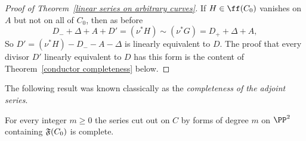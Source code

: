 \begin{proof}[Proof of Theorem~\ref{linear series on arbitrary curves}]
If $H\in \ff(C_{0})$ vanishes on $A$ but not on all of $C_{0}$, then as before
$$
 D_{-} +\Delta + A+ D' = (\nu^*H) \sim (\nu^*G) = D_{+} + \Delta + A,
$$
So $D' = (\nu^*{H})-D_{-}-A-\Delta$ is linearly equivalent to $D$. The proof that every
divisor $D'$ linearly equivalent to $D$ has this form is the content of
Theorem~\ref{conductor completeness} below.
\end{proof}


The following result was known classically as the \emph{completeness of the adjoint series}.

\begin{theorem}\label{conductor completeness}
For every integer $m\geq 0$ the series cut out on $C$ by forms of degree $m$
on $\PP^{2}$ containing $\adj(C_{0})$ is complete.
\end{theorem}

